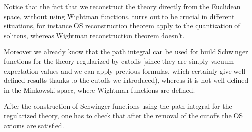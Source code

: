 \documentclass[../main/main.tex]{subfiles}
\begin{document}
Notice that the fact that we reconstruct the theory directly from the Euclidean space, without using Wightman functions, turns out to be crucial in different situations, for instance OS reconstruction theorem apply to the quantization of solitons, whereas Wightman reconstruction theorem doesn't. 

Moreover we already know that the path integral can be used for build Schwinger functions for the theory regularized by cutoffs (since they are simply vacuum expectation values and we can apply previous formulas, which certainly give well-defined results thanks to the cutoffs we introduced), whereas it is not well defined in the Minkowski space, where Wightman functions are defined. 

After the construction of Schwinger functions using the path integral for the regularized theory, one has to check that after the removal of the cutoffs the OS axioms are satisfied. 
\end{document}
